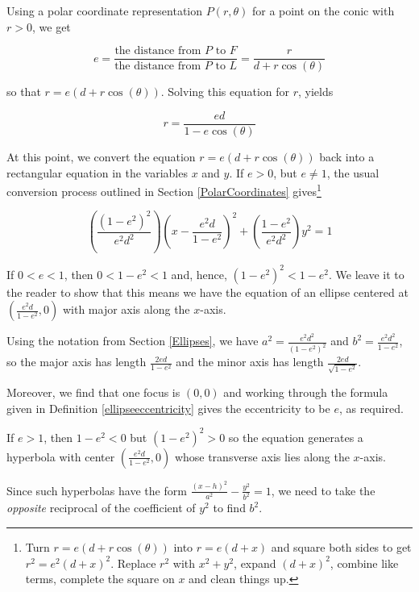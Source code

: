 \documentclass{ximera}
\begin{document}
{Using a polar coordinate representation $P(r,\theta)$ for a point on the conic with $r > 0$, we get

\[ e =  \dfrac{\text{the distance from $P$ to $F$}}{\text{the distance from $P$ to $L$}} = \dfrac{r}{d+r\cos(\theta)} \]

so that $r = e(d+r\cos(\theta))$.  Solving this equation for $r$, yields 


\[ r = \dfrac{ed}{1-e\cos(\theta)}\]

At this point, we convert the equation $r = e(d+r\cos(\theta))$ back into a rectangular equation in the variables $x$ and $y$.  If $e > 0$, but $e\neq 1$, the usual conversion process outlined in Section \ref{PolarCoordinates} gives\footnote{Turn $r = e(d+r\cos(\theta))$ into $r = e(d + x)$ and square both sides to get $r^{2} = e^{2}(d + x)^{2}$.  Replace $r^{2}$ with $x^{2} + y^{2}$, expand $(d + x)^{2}$, combine like terms, complete the square on $x$ and clean things up.}

\[ \left( \frac{\left(1-e^2\right)^2}{e^2d^2}\right) \left(x - \dfrac{e^2 d}{1-e^2}\right)^2 + \left(\frac{1-e^2}{e^2d^2}\right) y^2 = 1\]


If $0 < e < 1$, then $0< 1-e^2 < 1$ and, hence, $(1-e^2)^2 < 1-e^2$.  We leave it to the reader to show that this means we have  the equation of an ellipse centered at  $\left(\frac{e^2 d}{1-e^2}, 0\right)$  with major axis along the $x$-axis. 

\smallskip

Using the notation from Section \ref{Ellipses}, we have $a^2 = \frac{e^2 d^2}{\left(1-e^2\right)^2}$ and $b^2 = \frac{e^2 d^2}{1-e^2}$, so the major axis has length $\frac{2ed}{1-e^2}$ and the minor axis has length $\frac{2ed}{\sqrt{1-e^2}}$.  

\smallskip

Moreover, we find that one focus is $(0,0)$ and working through the formula given in  Definition \ref{ellipseeccentricity} gives the eccentricity to be $e$, as required. 

\smallskip

 If $e > 1$, then $1 - e^2 < 0$ but $(1-e^2)^2 > 0$ so the equation generates a hyperbola with center $\left(\frac{e^2 d}{1-e^2}, 0\right)$ whose transverse axis lies along the $x$-axis.  
 
 \smallskip
 
 Since such hyperbolas have the form $\frac{(x-h)^2}{a^2} -\frac{y^2}{b^2} = 1$, we need to take the \textit{opposite} reciprocal of the coefficient of $y^2$ to find $b^2$. 
 
}
\end{document}
